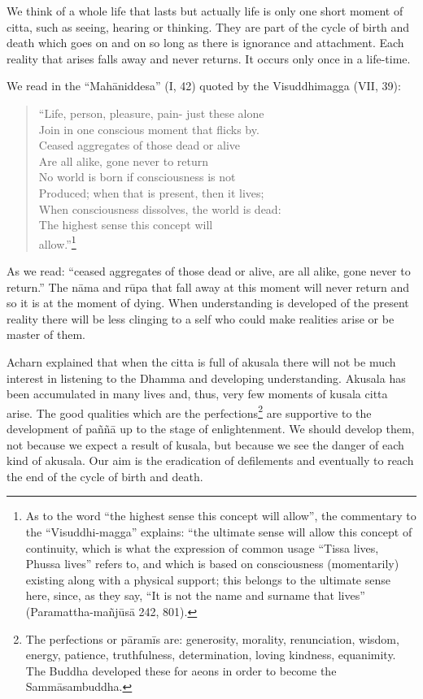 We think of a whole life that lasts but actually life is only one short
moment of citta, such as seeing, hearing or thinking. They are part of
the cycle of birth and death which goes on and on so long as there is
ignorance and attachment. Each reality that arises falls away and never
returns. It occurs only once in a life-time.

We read in the ``Mahāniddesa'' (I, 42) quoted by the Visuddhimagga (VII,
39):

\begin{verse}
``Life, person, pleasure, pain- just these alone\\

Join in one conscious moment that flicks by.\\

Ceased aggregates of those dead or alive\\

Are all alike, gone never to return\\

No world is born if consciousness is not\\

Produced; when that is present, then it lives;\\

When consciousness dissolves, the world is dead:\\

The highest sense this concept will\\
allow.''\footnote{As to the word ``the
highest sense this concept will allow'', the commentary to the
``Visuddhi-magga'' explains: ``the ultimate sense will allow this
concept of continuity, which is what the expression of common usage
``Tissa lives, Phussa lives'' refers to, and which is based on
consciousness (momentarily) existing along with a physical support; this
belongs to the ultimate sense here, since, as they say, ``It is not the
name and surname that lives'' (Paramattha-mañjūsā 242, 801).
}
\end{verse}

As we read: ``ceased aggregates of those dead or alive, are all alike,
gone never to return.'' The nāma and rūpa that fall away at this moment
will never return and so it is at the moment of dying. When
understanding is developed of the present reality there will be less
clinging to a self who could make realities arise or be master of them.

Acharn explained that when the citta is full of akusala there will not
be much interest in listening to the Dhamma and developing
understanding. Akusala has been accumulated in many lives and, thus,
very few moments of kusala citta arise. The good qualities which are the
perfections\footnote{The perfections or
pāramīs are: generosity, morality, renunciation, wisdom, energy,
patience, truthfulness, determination, loving kindness, equanimity. The
Buddha developed these for aeons in order to become the Sammāsambuddha.} are
supportive to the development of paññā up to the stage of enlightenment.
We should develop them, not because we expect a result of kusala, but
because we see the danger of each kind of akusala. Our aim is the
eradication of defilements and eventually to reach the end of the cycle
of birth and death.

